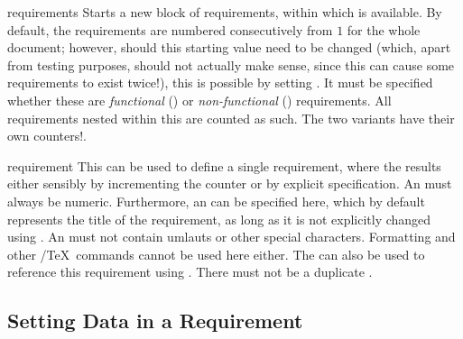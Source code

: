 \documentclass{sopra-base}
\begin{document}
\begin{environment}{requirements}{}
    Starts a new block of requirements, within which  is available. By default, the requirements
    are numbered consecutively from $1$ for the whole document; however, should this starting value need to be changed (which, apart from testing purposes, should not actually make sense,
    since this can cause some requirements to exist twice!), this is possible
    by setting . It must be specified whether these are
    \emph{functional} () or \emph{non-functional} ()
    requirements. All requirements nested within this are counted as such.
    The two variants have their own counters!. 
\end{environment}

\begin{environment}{requirement}{}
     This can be used to define a single requirement, where the 
    results either sensibly by incrementing the counter or by explicit specification. An  must always be numeric. Furthermore, an  can be specified here, which by default represents the title of the requirement,
    as long as it is not explicitly changed using . An  must not contain umlauts or other special characters. Formatting and other
    \LaTeXe/\TeX\ commands cannot be used here either. The  can also be used to reference this requirement
    using . There must not be a duplicate .
\end{environment}

\subsection{Setting Data in a Requirement}

 
\end{document}
